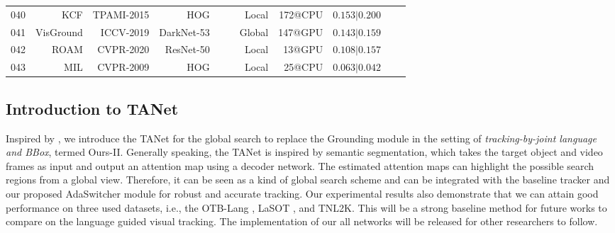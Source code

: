 \documentclass[final]{cvpr}
\begin{document}
\begin{table*}[!htp]
\begin{tabular}{rrrrccrrccc}
040			&KCF				 \cite{Henriques2015High}					&TPAMI-2015    	&HOG     			&\cmark     			&\xmark    	&Local    		 		&172@CPU    	 			&$0.153|0.200$		 	\\
041			&VisGround	 \cite{yang2019fastgrounding}				&ICCV-2019    	&DarkNet-53     	&\xmark     			&\cmark    	&Global    		 	&147@GPU    	 			&$0.143|0.159$		\\  
042			&ROAM			 \cite{yang2020roam}							&CVPR-2020    	&ResNet-50     	&\xmark     			&\cmark    	&Local    		 		&13@GPU    	 			&$0.108|0.157$		 	\\
043			&MIL				 \cite{babenko2009MIL}						&CVPR-2009    	&HOG     			&\cmark     			&\xmark    	&Local    		 		&25@CPU   				&$0.063|0.042$		 	\\
\hline \toprule [0.8 pt]
\end{tabular}
\end{table*} 








 










\subsection{Introduction to TANet} 

Inspired by \cite{wang2019GANTrack, wang2018describe, deepMTA}, we introduce the TANet for the global search to replace the Grounding module \cite{yang2019fastgrounding} in the setting of \emph{tracking-by-joint language and BBox}, termed Ours-II. Generally speaking, the TANet is inspired by semantic segmentation, which takes the target object and video frames as input and output an attention map using a decoder network. The estimated attention maps can highlight the possible search regions from a global view. Therefore, it can be seen as a kind of global search scheme and can be integrated with the baseline tracker and our proposed AdaSwitcher module for robust and accurate tracking. Our experimental results also demonstrate that we can attain good performance on three used datasets, i.e., the OTB-Lang \cite{li2017tracking}, LaSOT \cite{fan2019lasot}, and TNL2K. This will be a strong baseline method for future works to compare on the language guided visual tracking. The implementation of our all networks will be released for other researchers to follow. 
\end{document}
